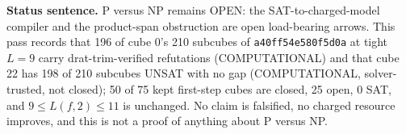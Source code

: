 \documentclass[11pt]{article}
\begin{document}
\bigskip
\noindent\textbf{Status sentence.} P versus NP remains OPEN: the SAT-to-charged-model compiler and the product-span obstruction are open load-bearing arrows. This pass records that 196 of cube 0's 210 subcubes of \texttt{a40ff54e580f5d0a} at tight $L=9$ carry drat-trim-verified refutations (COMPUTATIONAL) and that cube 22 has 198 of 210 subcubes UNSAT with no gap (COMPUTATIONAL, solver-trusted, not closed); 50 of 75 kept first-step cubes are closed, 25 open, 0 SAT, and $9\le L(f,2)\le 11$ is unchanged. No claim is falsified, no charged resource improves, and this is not a proof of anything about P versus NP.
\end{document}
